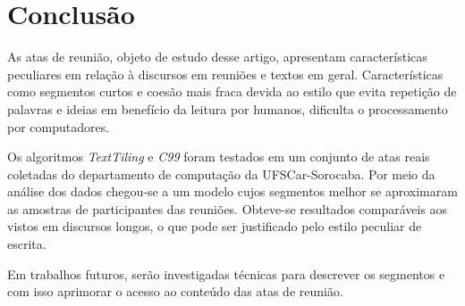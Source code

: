 \section{Conclusão}
	\label{sec:conclusao}
	
	As atas de reunião, objeto de estudo desse artigo, apresentam características peculiares em relação à discursos em reuniões e textos em geral. Características como segmentos curtos e coesão mais fraca devida ao estilo que evita repetição de palavras e ideias em benefício da leitura por humanos, dificulta o processamento por computadores.

	Os algoritmos \textit{TextTiling} e \textit{C99} foram testados em um conjunto de atas reais coletadas do departamento de computação da UFSCar-Sorocaba. Por meio da análise dos dados chegou-se a um modelo cujos segmentos melhor se aproximaram as amostras de participantes das reuniões. Obteve-se resultados comparáveis aos vistos em discursos longos, o que pode ser justificado pelo estilo peculiar de escrita.	
	
	Em trabalhos futuros, serão investigadas técnicas para descrever os segmentos e com isso aprimorar o acesso ao conteúdo das atas de reunião.
